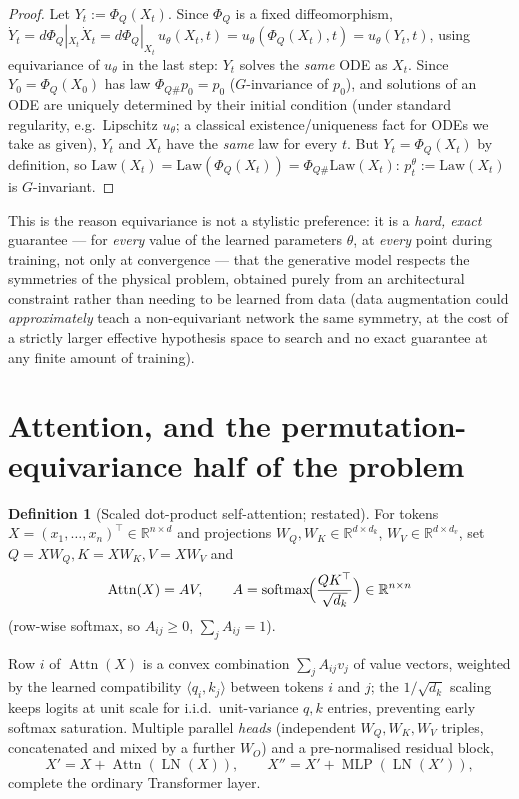 \documentclass[11pt,a4paper]{report}
\theoremstyle{definition}
\newtheorem{definition}[definition]{Definition}
\theoremstyle{remark}
\DeclareMathOperator{\Attn}{Attn}
\DeclareMathOperator{\softmax}{softmax}
\DeclareMathOperator{\LN}{LN}
\DeclareMathOperator{\MLP}{MLP}
\newcommand{\RR}{\mathbb R}
\begin{document}
\begin{proof}
Let $Y_t := \Phi_Q(X_t)$. Since $\Phi_Q$ is a fixed diffeomorphism,
$\dot Y_t = d\Phi_Q|_{X_t}\dot X_t = d\Phi_Q|_{X_t}\,u_\theta(X_t,t)
= u_\theta(\Phi_Q(X_t),t) = u_\theta(Y_t,t)$, using equivariance of
$u_\theta$ in the last step: $Y_t$ solves the \emph{same} ODE as $X_t$.
Since $Y_0=\Phi_Q(X_0)$ has law $\Phi_{Q\#}p_0 = p_0$ ($G$-invariance of
$p_0$), and solutions of an ODE are uniquely determined by their initial
condition (under standard regularity, e.g.\ Lipschitz $u_\theta$; a
classical existence/uniqueness fact for ODEs we take as given), $Y_t$ and
$X_t$ have the \emph{same} law for every $t$. But $Y_t=\Phi_Q(X_t)$ by
definition, so $\mathrm{Law}(X_t) = \mathrm{Law}(\Phi_Q(X_t)) = \Phi_{Q\#}\mathrm{Law}(X_t)$:
$p_t^\theta:=\mathrm{Law}(X_t)$ is $G$-invariant.
\end{proof}

This is the reason equivariance is not a stylistic preference: it is a
\emph{hard, exact} guarantee --- for \emph{every} value of the learned
parameters $\theta$, at \emph{every} point during training, not only at
convergence --- that the generative model respects the symmetries of the
physical problem, obtained purely from an architectural constraint rather
than needing to be learned from data (data augmentation could
\emph{approximately} teach a non-equivariant network the same symmetry, at
the cost of a strictly larger effective hypothesis space to search and no
exact guarantee at any finite amount of training).

\section{Attention, and the permutation-equivariance half of the problem}
\label{sec:transformer-scratch}

\begin{definition}[Scaled dot-product self-attention; restated]
\label{def:attention-scratch}
For tokens $X=(x_1,\dots,x_n)^\top\in\RR^{n\times d}$ and projections
$W_Q,W_K\in\RR^{d\times d_k}$, $W_V\in\RR^{d\times d_v}$, set
$Q=XW_Q,K=XW_K,V=XW_V$ and
\[
\Attn(X) = AV,
\qquad
A = \softmax\!\Bigl(\frac{QK^\top}{\sqrt{d_k}}\Bigr)\in\RR^{n\times n}
\]
(row-wise softmax, so $A_{ij}\ge0$, $\sum_jA_{ij}=1$).
\end{definition}

Row $i$ of $\Attn(X)$ is a convex combination $\sum_jA_{ij}v_j$ of value
vectors, weighted by the learned compatibility $\langle q_i,k_j\rangle$
between tokens $i$ and $j$; the $1/\sqrt{d_k}$ scaling keeps logits at unit
scale for i.i.d.\ unit-variance $q,k$ entries, preventing early softmax
saturation. Multiple parallel \emph{heads} (independent
$W_Q,W_K,W_V$ triples, concatenated and mixed by a further $W_O$) and a
pre-normalised residual block,
\begin{equation}
\label{eq:transformer-block-scratch}
X' = X + \Attn(\LN(X)),
\qquad
X'' = X' + \MLP(\LN(X')) ,
\end{equation}
complete the ordinary Transformer layer.
\end{document}
